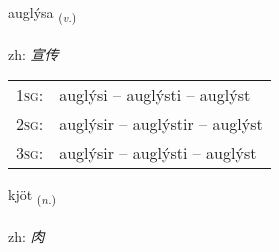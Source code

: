 \documentclass[frontgrid, backgrid]{flacards}\usepackage[]{graphicx}\usepackage[]{color}
\begin{document}
\renewcommand{\flhead}{\vskip5pt \fboxsep=0pt {\small\bfseries\footnotesize Sagnorð | 动词}}
\renewcommand{\fcfoot}{\vskip5pt \fboxsep=0pt \hspace{2pt}{\small\bfseries\footnotesize 2K}}

\renewcommand{\blhead}{\vskip5pt {\small\bfseries\footnotesize Sagnorð | 动词 }}
\renewcommand{\bcfoot}{\vskip5pt \hspace{2pt}{\small\bfseries\footnotesize 2K}}


{auglýsa \small{\textsubscript{(\textit{v.})}} \\[1ex] %
\textphonetic{[œiɣlisa]} \\
zh: \emph{宣传} \\  [2ex]
\renewcommand*{\arraystretch}{0.8}
\begin{tabular}{p{1cm}l}
\textsc{1sg}: & auglýsi -- auglýsti -- auglýst \\ 
\textsc{2sg}: & auglýsir -- auglýstir -- auglýst \\ 
\textsc{3sg}: & auglýsir -- auglýsti -- auglýst \\ 
\end{tabular}
}

\renewcommand{\flhead}{\vskip5pt \fboxsep=0pt {\small\bfseries\footnotesize Nafnorð | 名词}}
\renewcommand{\fcfoot}{\vskip5pt \fboxsep=0pt \hspace{2pt}{\small\bfseries\footnotesize 2K}}

\renewcommand{\blhead}{\vskip5pt {\small\bfseries\footnotesize Nafnorð | 名词 }}
\renewcommand{\bcfoot}{\vskip5pt \hspace{2pt}{\small\bfseries\footnotesize 2K}}


{kjöt \small{\textsubscript{(\textit{n.})}} \\[1ex] %
\textphonetic{[cʰœːt]} \\
zh: \emph{肉} \\  [2ex]
\renewcommand*{\arraystretch}{0.8}
}
\end{document}
